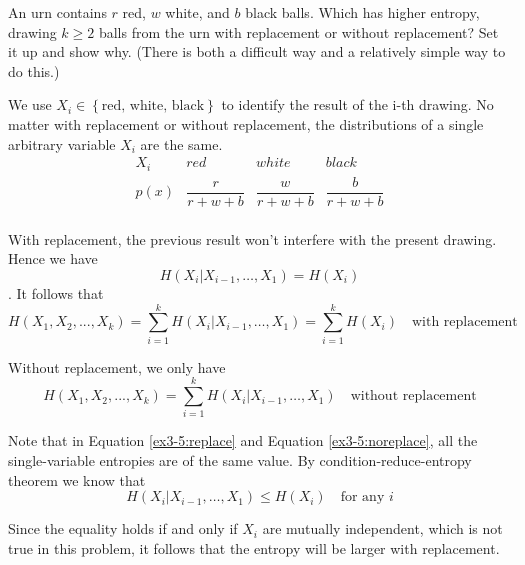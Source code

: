\begin{exercise}{An urn contains $r$ red, $w$ white, and $b$ black balls. Which has higher entropy, drawing $k \ge 2$ balls from the urn with replacement or without replacement? Set it up and show why. (There is both a difficult way and a relatively simple way to do this.)}
  \begin{solution}
    We use $X_i \in \left\{ \text{red, white, black} \right\}$ to identify the result of the i-th drawing. No matter with replacement or without replacement, the distributions of a single arbitrary variable $X_i$ are the same.
    \begin{equation}
      \begin{array}{cccc}
        X_i & red & white & black \\
        p(x) & \dfrac{r}{r+w+b} & \dfrac{w}{r+w+b} & \dfrac{b}{r+w+b} \\
      \end{array}
    \end{equation}

    With replacement, the previous result won't interfere with the present drawing. Hence we have $$H\left(X_{i} | X_{i-1}, \ldots, X_{1}\right)=H\left(X_{i}\right)$$. It follows that
    \begin{equation}
      H(X_1,X_2,...,X_k)  = \sum_{i=1}^{k}  H\left(X_{i} | X_{i-1}, \ldots, X_{1}\right) = \sum_{i=1}^{k}H\left(X_{i}\right) \quad \text{with replacement}
      \label{ex3-5:replace}
    \end{equation}

    Without replacement, we only have
    \begin{equation}
      H(X_1,X_2,...,X_k) = \sum_{i=1}^{k}  H\left(X_{i} | X_{i-1}, \ldots, X_{1}\right) \quad \text{without replacement}
      \label{ex3-5:noreplace}
    \end{equation}

    Note that in Equation \ref{ex3-5:replace} and Equation \ref{ex3-5:noreplace}, all the single-variable entropies are of the same value. By condition-reduce-entropy theorem we know that
    $$H\left(X_{i} | X_{i-1}, \ldots, X_{1}\right) \le H(X_i) \quad \text{for any } i $$

    Since the equality holds if and only if $X_i$ are mutually independent, which is not true in this problem, it follows that the entropy will be larger with replacement.
  \end{solution}
\end{exercise}

